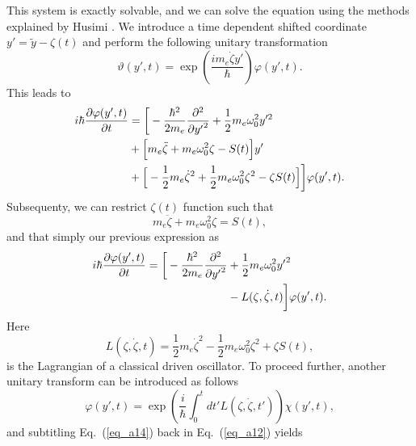 This system is exactly solvable, and we can solve the equation using the methods explained by Husimi \cite{husimi53}. We introduce a time dependent shifted coordinate $ y' = \tilde{y} - \zeta(t)$ and perform the following unitary transformation
\begin{equation} \label{eq_a9}
    \vartheta(y',t) = \exp(\frac{im_e\dot{\zeta}y'}{\hbar})\varphi(y',t).
\end{equation}
This leads to
\begin{equation} \label{eq_a10}
  \begin{aligned}
    i \hbar \pdv{\varphi(y',t)}{t}   &=
    \bigg[
        -  \frac{\hbar^2}{2m_e}\pdv[2]{{y'}}
        + \frac{1}{2} m_e \omega_0^2 y'^2 \\
        & +
        \Big[
            m_e\ddot{\zeta} + m_e\omega_0^2\zeta - S(t)
        \Big]y' \\
        &
        +
        \Big[
            - \frac{1}{2} m_e\dot{\zeta}^2 + \frac{1}{2}m_e\omega_0^2 \zeta^2 - \zeta S(t)
        \Big]
    \bigg]\varphi(y',t).
  \end{aligned}
\end{equation}
Subsequenty, we can restrict $\zeta(t)$ function such that
\begin{equation} \label{eq_a11}
  m_e\ddot{\zeta} + m_e\omega_0^2\zeta = S(t),
\end{equation}
and that simply our previous expression as
\begin{equation} \label{eq_a12}
  \begin{aligned}
    i \hbar \pdv{\varphi(y',t)}{t}   =
    \bigg[
        -  \frac{\hbar^2}{2m_e}\pdv[2]{{y'}} &
        + \frac{1}{2} m_e \omega_0^2 {y'}^2 \\
        &
        - L(\zeta,\dot{\zeta},t)
    \bigg]\varphi(y',t).
  \end{aligned}
\end{equation}
Here
\begin{equation} \label{eq_a13}
  L(\zeta,\dot{\zeta},t) = \frac{1}{2} m_e\dot{\zeta}^2 - \frac{1}{2}m_e\omega_0^2 \zeta^2 + \zeta S(t),
\end{equation}
is the Lagrangian of a classical driven oscillator. To proceed further, another unitary transform can be introduced as follows
\begin{equation} \label{eq_a14}
    \varphi(y',t) = \exp(\frac{i}{\hbar}\int_0^{t}dt'L(\zeta,\dot{\zeta},t')) \chi(y',t),
\end{equation}
and subtitling Eq.~(\ref{eq_a14}) back in Eq.~(\ref{eq_a12}) yields
